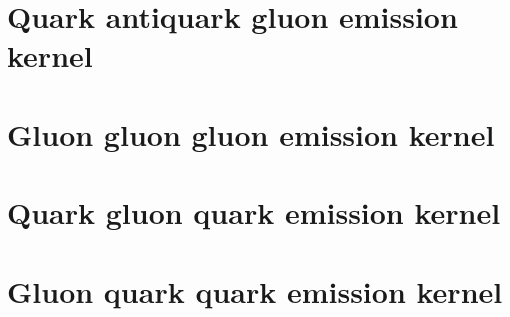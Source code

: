 \documentclass[12pt,a4paper,oneside]{report}
\begin{document}
    \parindent=0pt
    \linespread{1.2}
    \thispagestyle{plain}



\pagebreak

\tableofcontents
\thispagestyle{empty}
\thispagestyle{empty}
\quad
\newpage
{} 





\newpage




\chapter{Quark antiquark gluon emission kernel}

\newpage
\chapter{Gluon gluon gluon emission kernel}

\chapter{Quark gluon quark emission kernel}
  
\chapter{Gluon quark quark emission kernel}
       





\appendix

 
\end{document}

